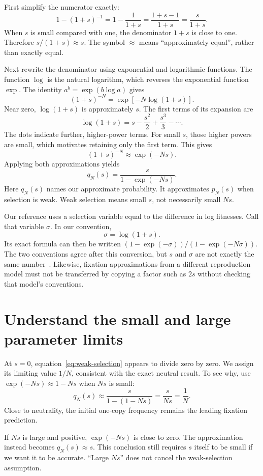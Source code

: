 First simplify the numerator exactly:
\[
1-(1+s)^{-1}
=1-\frac{1}{1+s}
=\frac{1+s-1}{1+s}
=\frac{s}{1+s}.
\]
When $s$ is small compared with one, the denominator $1+s$ is close to one. Therefore $s/(1+s)\approx s$. The symbol $\approx$ means ``approximately equal'', rather than exactly equal.

Next rewrite the denominator using exponential and logarithmic functions. The function $\log$ is the natural logarithm, which reverses the exponential function $\exp$. The identity $a^b=\exp(b\log a)$ gives
\[
(1+s)^{-N}=\exp[-N\log(1+s)].
\]
Near zero, $\log(1+s)$ is approximately $s$. The first terms of its expansion are
\[
\log(1+s)=s-\frac{s^2}{2}+\frac{s^3}{3}-\cdots.
\]
The dots indicate further, higher-power terms. For small $s$, those higher powers are small, which motivates retaining only the first term. This gives
\[
(1+s)^{-N}\approx\exp(-Ns).
\]
Applying both approximations yields
\begin{equation}
q_N(s)=\frac{s}{1-\exp(-Ns)}.
\label{eq:weak-selection}
\end{equation}
Here $q_N(s)$ names our approximate probability. It approximates $p_N(s)$ when selection is weak. Weak selection means small $s$, not necessarily small $Ns$.

Our reference uses a selection variable equal to the difference in log fitnesses. Call that variable $\sigma$. In our convention,
\[
\sigma=\log(1+s).
\]
Its exact formula can then be written $(1-\exp(-\sigma))/(1-\exp(-N\sigma))$. The two conventions agree after this conversion, but $s$ and $\sigma$ are not exactly the same number~\cite{mccandlish2015}. Likewise, fixation approximations from a different reproduction model must not be transferred by copying a factor such as $2s$ without checking that model's conventions.

\section{Understand the small and large parameter limits}

At $s=0$, equation~\eqref{eq:weak-selection} appears to divide zero by zero. We assign its limiting value $1/N$, consistent with the exact neutral result. To see why, use $\exp(-Ns)\approx1-Ns$ when $Ns$ is small:
\[
q_N(s)\approx\frac{s}{1-(1-Ns)}
=\frac{s}{Ns}=\frac{1}{N}.
\]
Close to neutrality, the initial one-copy frequency remains the leading fixation prediction.

If $Ns$ is large and positive, $\exp(-Ns)$ is close to zero. The approximation instead becomes $q_N(s)\approx s$. This conclusion still requires $s$ itself to be small if we want it to be accurate. ``Large $Ns$'' does not cancel the weak-selection assumption.

